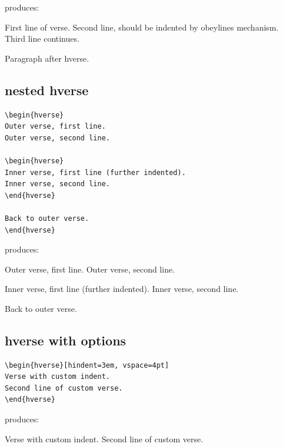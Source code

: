\documentclass[11pt, twoside, openany]{article}
\begin{document}
\noindent produces:

\begin{hverse}
First line of verse.
Second line, should be indented by obeylines mechanism.
Third line continues.
\end{hverse}

Paragraph after hverse.




\subsection{nested hverse}

\begin{verbatim}
\begin{hverse}
Outer verse, first line.
Outer verse, second line.

\begin{hverse}
Inner verse, first line (further indented).
Inner verse, second line.
\end{hverse}

Back to outer verse.
\end{hverse}
\end{verbatim}

\noindent produces:

\begin{hverse}
Outer verse, first line.
Outer verse, second line.

\begin{hverse}
Inner verse, first line (further indented).
Inner verse, second line.
\end{hverse}

Back to outer verse.
\end{hverse}


\subsection{hverse with options}

\begin{verbatim}
\begin{hverse}[hindent=3em, vspace=4pt]
Verse with custom indent.
Second line of custom verse.
\end{hverse}
\end{verbatim}

\noindent produces:

\begin{hverse}[hindent=3em, vspace=4pt]
Verse with custom indent.
Second line of custom verse.
\end{hverse}
\end{document}
